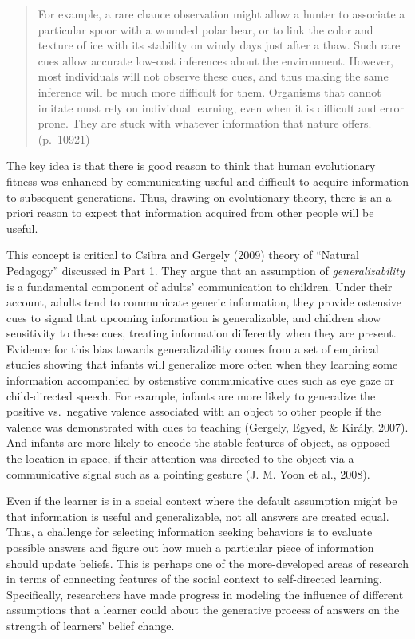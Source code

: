 \documentclass[english,floatsintext,man]{apa6}
\theoremstyle{definition}
\theoremstyle{definition}
\theoremstyle{definition}
\theoremstyle{remark}
\begin{document}
\begin{quote}
For example, a rare chance observation might allow a hunter to associate
a particular spoor with a wounded polar bear, or to link the color and
texture of ice with its stability on windy days just after a thaw. Such
rare cues allow accurate low-cost inferences about the environment.
However, most individuals will not observe these cues, and thus making
the same inference will be much more difficult for them. Organisms that
cannot imitate must rely on individual learning, even when it is
difficult and error prone. They are stuck with whatever information that
nature offers. (p.~10921)
\end{quote}

\noindent
The key idea is that there is good reason to think that human
evolutionary fitness was enhanced by communicating useful and difficult
to acquire information to subsequent generations. Thus, drawing on
evolutionary theory, there is an a priori reason to expect that
information acquired from other people will be useful.

This concept is critical to Csibra and Gergely (2009) theory of
\enquote{Natural Pedagogy} discussed in Part 1. They argue that an
assumption of \emph{generalizability} is a fundamental component of
adults' communication to children. Under their account, adults tend to
communicate generic information, they provide ostensive cues to signal
that upcoming information is generalizable, and children show
sensitivity to these cues, treating information differently when they
are present. Evidence for this bias towards generalizability comes from
a set of empirical studies showing that infants will generalize more
often when they learning some information accompanied by ostenstive
communicative cues such as eye gaze or child-directed speech. For
example, infants are more likely to generalize the positive vs.~negative
valence associated with an object to other people if the valence was
demonstrated with cues to teaching (Gergely, Egyed, \& Király, 2007).
And infants are more likely to encode the stable features of object, as
opposed the location in space, if their attention was directed to the
object via a communicative signal such as a pointing gesture (J. M. Yoon
et al., 2008).

Even if the learner is in a social context where the default assumption
might be that information is useful and generalizable, not all answers
are created equal. Thus, a challenge for selecting information seeking
behaviors is to evaluate possible answers and figure out how much a
particular piece of information should update beliefs. This is perhaps
one of the more-developed areas of research in terms of connecting
features of the social context to self-directed learning. Specifically,
researchers have made progress in modeling the influence of different
assumptions that a learner could about the generative process of answers
on the strength of learners' belief change.
\end{document}
